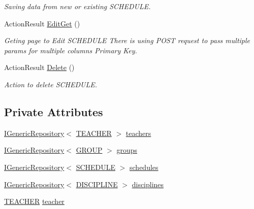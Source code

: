 \begin{DoxyCompactItemize}
\begin{DoxyCompactList}\small\item\em Saving data from new or existing S\+C\+H\+E\+D\+U\+LE. \end{DoxyCompactList}\item 
Action\+Result \hyperlink{class_in_study_asp_1_1_controllers_1_1_user_1_1_teacher_1_1_schedule_controller_a822c9455259b96a96ae333d25ca7bf1a}{Edit\+Get} ()
\begin{DoxyCompactList}\small\item\em Geting page to Edit S\+C\+H\+E\+D\+U\+LE There is using P\+O\+ST request to pass multiple params for multiple columns Primary Key. \end{DoxyCompactList}\item 
Action\+Result \hyperlink{class_in_study_asp_1_1_controllers_1_1_user_1_1_teacher_1_1_schedule_controller_ad44fb1d37e6119aece41d3b71cb81ec8}{Delete} ()
\begin{DoxyCompactList}\small\item\em Action to delete S\+C\+H\+E\+D\+U\+LE. \end{DoxyCompactList}\end{DoxyCompactItemize}
\subsection*{Private Attributes}
\begin{DoxyCompactItemize}
\item 
\hyperlink{interface_repo_1_1_common_1_1_i_generic_repository}{I\+Generic\+Repository}$<$ \hyperlink{class_e_f_oracle_1_1_model_1_1_t_e_a_c_h_e_r}{T\+E\+A\+C\+H\+ER} $>$ \hyperlink{class_in_study_asp_1_1_controllers_1_1_user_1_1_teacher_1_1_schedule_controller_a74c7bae1cf29eef4b2c4b10b919f7f3f}{teachers}
\item 
\hyperlink{interface_repo_1_1_common_1_1_i_generic_repository}{I\+Generic\+Repository}$<$ \hyperlink{class_e_f_oracle_1_1_model_1_1_g_r_o_u_p}{G\+R\+O\+UP} $>$ \hyperlink{class_in_study_asp_1_1_controllers_1_1_user_1_1_teacher_1_1_schedule_controller_adca9d4990e412a7a5723c95b682fcba2}{groups}
\item 
\hyperlink{interface_repo_1_1_common_1_1_i_generic_repository}{I\+Generic\+Repository}$<$ \hyperlink{class_e_f_oracle_1_1_model_1_1_s_c_h_e_d_u_l_e}{S\+C\+H\+E\+D\+U\+LE} $>$ \hyperlink{class_in_study_asp_1_1_controllers_1_1_user_1_1_teacher_1_1_schedule_controller_aed008ef3307f7b8acecf751b084f9aad}{schedules}
\item 
\hyperlink{interface_repo_1_1_common_1_1_i_generic_repository}{I\+Generic\+Repository}$<$ \hyperlink{class_e_f_oracle_1_1_model_1_1_d_i_s_c_i_p_l_i_n_e}{D\+I\+S\+C\+I\+P\+L\+I\+NE} $>$ \hyperlink{class_in_study_asp_1_1_controllers_1_1_user_1_1_teacher_1_1_schedule_controller_a4102c2015fbace8b8213c9e3da2f72a8}{disciplines}
\item 
\hyperlink{class_e_f_oracle_1_1_model_1_1_t_e_a_c_h_e_r}{T\+E\+A\+C\+H\+ER} \hyperlink{class_in_study_asp_1_1_controllers_1_1_user_1_1_teacher_1_1_schedule_controller_a38f4c4a18010275b1be2ac2b87e5fc9b}{teacher}
\end{DoxyCompactItemize}


